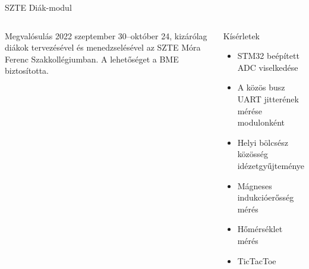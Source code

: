 \begin{frame}{SZTE Diák-modul}
\begin{columns}
\begin{block}{Megvalósulás}
		\small{2022 szeptember 30--október 24, kizárólag diákok tervezésével és menedzselésével az SZTE Móra Ferenc Szakkollégiumban. A lehetőséget a BME biztosította.}
	\end{block}
	\begin{block}{Kísérletek}
		\begin{itemize}
			\item STM32 beépített ADC viselkedése
			\item A közös busz UART jitterének mérése modulonként
			\item Helyi bölcsész közösség idézetgyűjteménye
			\item Mágneses indukcióerősség mérés
			\item Hőmérséklet mérés
			\item TicTacToe
		\end{itemize}
	\end{block}
\end{columns}
\end{frame}
